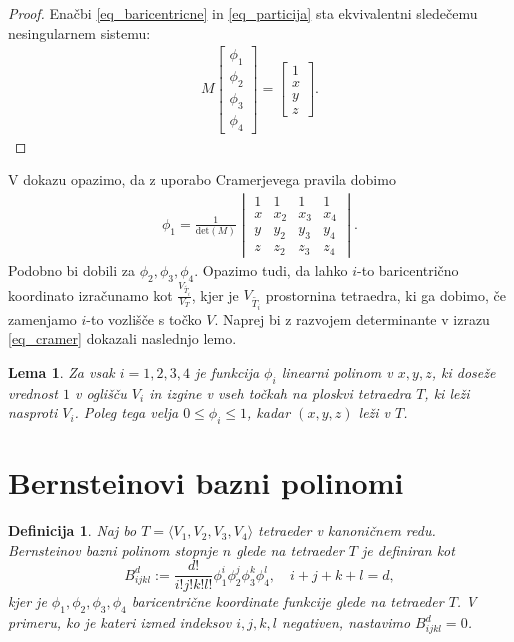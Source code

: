 \documentclass[11pt,a4paper]{article}
\newtheorem{definition}{Definicija}
\newtheorem{lemma}{Lema}
\begin{document}
\begin{proof}
    Enačbi \ref{eq_baricentricne} in \ref{eq_particija} sta ekvivalentni
    sledečemu nesingularnem sistemu:
    \begin{align}
        M \begin{bmatrix}\phi_1 \\ \phi_2 \\ \phi_3 \\ \phi_4 \end{bmatrix} = \begin{bmatrix}
            1 \\ x \\ y \\ z \end{bmatrix}.
    \end{align}
\end{proof}

V dokazu opazimo, da z uporabo Cramerjevega pravila dobimo
\begin{align}\label{eq_cramer}
    \phi_1 = \frac{1}{\text{det}(M)}
    \begin{vmatrix}
        1 & 1 & 1 & 1 \\
        x & x_2 & x_3 & x_4 \\
        y & y_2 & y_3 & y_4 \\
        z & z_2 & z_3 & z_4
    \end{vmatrix}.
\end{align}
Podobno bi dobili za $\phi_2, \phi_3, \phi_4$. 
Opazimo tudi, da lahko $i$-to baricentrično koordinato izračunamo
kot $\frac{V_{\widetilde{T_i}}}{V_T}$, kjer je $V_{\widetilde{T_i}}$
prostornina tetraedra, ki ga dobimo, če zamenjamo $i$-to vozlišče
s točko $V$. 
Naprej bi z razvojem determinante v izrazu \eqref{eq_cramer}
dokazali naslednjo lemo.

\begin{lemma}
    Za vsak $i = 1, 2, 3, 4$ je funkcija $\phi_i$ linearni polinom
    v $x, y, z$, ki doseže vrednost $1$ v oglišču $V_i$ in
    izgine v vseh točkah na ploskvi tetraedra $T$, ki leži
    nasproti $V_i$. Poleg tega velja
    $0 \leq \phi_i \leq 1$, kadar $(x, y, z)$ leži v $T$.
\end{lemma}

\section{Bernsteinovi bazni polinomi}

\begin{definition}
    Naj bo $T = \langle V_1, V_2, V_3, V_4 \rangle$ tetraeder v kanoničnem redu.
    Bernsteinov bazni polinom stopnje $n$ glede na tetraeder $T$ je definiran kot
    \begin{equation}
        B_{ijkl}^d := \frac{d!}{i!j!k!l!} \phi_1^i \phi_2^j \phi_3^k \phi_4^l, \quad i + j + k + l = d,
    \end{equation}
    kjer je $\phi_1, \phi_2, \phi_3, \phi_4$ baricentrične koordinate funkcije
    glede na tetraeder $T$. V primeru, ko je kateri izmed indeksov $i, j, k, l$ negativen, 
    nastavimo $B_{ijkl}^d = 0$.
\end{definition}
\end{document}
